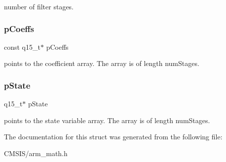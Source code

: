 number of filter stages. \mbox{\label{structarm__fir__lattice__instance__q15_ae85d417edcdce57e9a54f8c841580578}} 
\subsubsection{\texorpdfstring{pCoeffs}{pCoeffs}}
{\footnotesize\ttfamily const q15\+\_\+t$\ast$ p\+Coeffs}

points to the coefficient array. The array is of length num\+Stages. \mbox{\label{structarm__fir__lattice__instance__q15_ae29dfdb736374fcddaeaec4b7770170c}} 
\subsubsection{\texorpdfstring{pState}{pState}}
{\footnotesize\ttfamily q15\+\_\+t$\ast$ p\+State}

points to the state variable array. The array is of length num\+Stages. 

The documentation for this struct was generated from the following file\+:\begin{DoxyCompactItemize}
\item 
C\+M\+S\+I\+S/arm\+\_\+math.\+h\end{DoxyCompactItemize}
